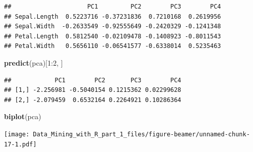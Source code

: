 \documentclass[ignorenonframetext,]{beamer}
\newenvironment{Shaded}{\begin{snugshade}}{\end{snugshade}}
\newcommand{\KeywordTok}[1]{\textcolor[rgb]{0.13,0.29,0.53}{\textbf{{#1}}}}
\newcommand{\DecValTok}[1]{\textcolor[rgb]{0.00,0.00,0.81}{{#1}}}
\newcommand{\NormalTok}[1]{{#1}}
\begin{document}
\begin{frame}[fragile]{}

\begin{Shaded}
\end{Shaded}

\begin{verbatim}
##                     PC1         PC2        PC3        PC4
## Sepal.Length  0.5223716 -0.37231836  0.7210168  0.2619956
## Sepal.Width  -0.2633549 -0.92555649 -0.2420329 -0.1241348
## Petal.Length  0.5812540 -0.02109478 -0.1408923 -0.8011543
## Petal.Width   0.5656110 -0.06541577 -0.6338014  0.5235463
\end{verbatim}

\end{frame}

\begin{frame}[fragile]{}

\begin{Shaded}
\begin{Highlighting}[]
\KeywordTok{predict}\NormalTok{(pca)[}\DecValTok{1}\NormalTok{:}\DecValTok{2}\NormalTok{, ]}
\end{Highlighting}
\end{Shaded}

\begin{verbatim}
##            PC1        PC2       PC3        PC4
## [1,] -2.256981 -0.5040154 0.1215362 0.02299628
## [2,] -2.079459  0.6532164 0.2264921 0.10286364
\end{verbatim}

\begin{Shaded}
\begin{Highlighting}[]
\KeywordTok{biplot}\NormalTok{(pca)}
\end{Highlighting}
\end{Shaded}

\texttt{[image: Data\_Mining\_with\_R\_part\_1\_files/figure-beamer/unnamed-chunk-17-1.pdf]}

\end{frame}
\end{document}
